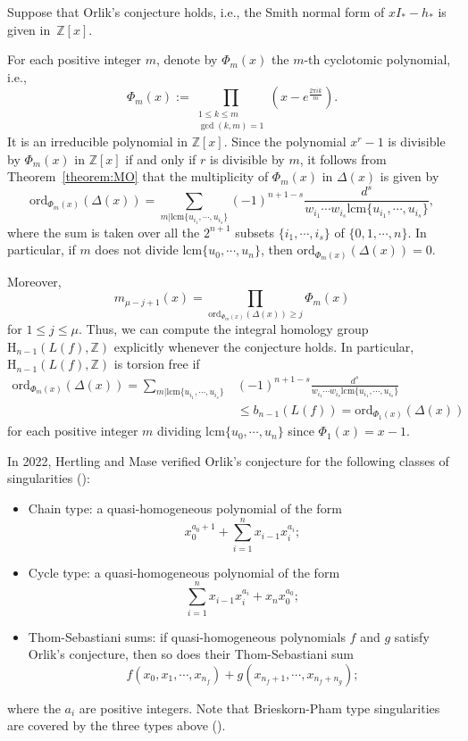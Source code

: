 \documentclass[12pt]{amsart}
\theoremstyle{definition}
\theoremstyle{remark}
\begin{document}
Suppose that Orlik's conjecture holds, i.e., the Smith normal form of  $xI_\ast-h_\ast$ is given in~$\mathbb{Z}[x]$.

For each positive integer $m$, denote by $\Phi_m(x)$ the $m$-th cyclotomic polynomial, i.e.,
\[\Phi_m(x):=\prod_{\substack{1\leq k\leq m \\ \gcd (k,m)=1}}\left(x-e^{\frac{2\pi i k}{m}}\right).\]
It is an irreducible polynomial in $\mathbb{Z}[x]$.
Since the polynomial $x^r-1$ is divisible by $\Phi_m(x)$ in $\mathbb{Z}[x]$ if and only if $r$ is divisible by $m$, it follows from Theorem~\ref{theorem:MO} that
the multiplicity of $\Phi_m(x)$ in $\Delta(x)$ is given by
\[\mathrm{ord}_{\Phi_m(x)}\left(\Delta(x)\right)=\sum_{m|\mathrm{lcm} \{u_{i_1},\cdots, u_{i_s}\}} (-1)^{n+1-s}\frac{d^s}{w_{i_1}\cdots w_{i_s}\mathrm{lcm} \{u_{i_1},\cdots, u_{i_s}\}},\]
 where the sum is taken over all the $2^{n+1}$ subsets $\{i_1,\cdots, i_s\}$ of $\{0,1,\cdots,n\}$. In particular,  if $m$ does not divide 
 $\mathrm{lcm} \{u_0,\cdots, u_n\}$, then $\mathrm{ord}_{\Phi_m(x)}\left(\Delta(x)\right)=0$.
 
 Moreover,
\[m_{\mu-j+1}(x)=\prod_{\mathrm{ord}_{\Phi_m(x)}\left(\Delta(x)\right)\geq j}\Phi_{m}(x)\]
for $1\leq j\leq \mu$. 
Thus, we can compute the integral homology group $\mathrm{H}_{n-1}(L(f),\mathbb{Z})$ explicitly whenever the conjecture holds. 
In particular,
  $\mathrm{H}_{n-1}(L(f),\mathbb{Z})$ is torsion free  if
\begin{equation}\label{eq:torsion2}
\begin{split}
\mathrm{ord}_{\Phi_m(x)}\left(\Delta(x)\right)=\sum_{m|\mathrm{lcm} \{u_{i_1},\cdots, u_{i_s}\}} &(-1)^{n+1-s}\frac{d^s}{w_{i_1}\cdots w_{i_s}\mathrm{lcm} \{u_{i_1},\cdots, u_{i_s}\}}\\
&\leq  b_{n-1}(L(f))=\mathrm{ord}_{\Phi_1(x)}\left(\Delta(x)\right)
\end{split}
\end{equation}
for each positive integer $m$ dividing 
 $\mathrm{lcm} \{u_0,\cdots, u_n\}$ since $\Phi_{1}(x)=x-1$.

In 2022, 
Hertling and Mase verified Orlik's conjecture  for the following classes of singularities (\cite[Theorem~1.3]{HM22}):
\begin{itemize}
    \item Chain type: a quasi-homogeneous polynomial of the form
    \[
        x_0^{a_0+1}+\sum_{i=1}^nx_{i-1}x_i^{a_i};
    \]
    \item Cycle type: a quasi-homogeneous polynomial of the form
    \[
        \sum_{i=1}^nx_{i-1}x_i^{a_i}+x_nx_0^{a_0};
    \]
    \item Thom-Sebastiani sums: if quasi-homogeneous polynomials $f$ and $g$ satisfy Orlik's conjecture, then so does their Thom-Sebastiani sum
    \[ 
        f(x_0,x_1,\cdots,x_{n_f})+g(x_{n_f+1},\cdots,x_{n_f+n_g});
    \]
\end{itemize}
where the $a_i$ are positive integers. Note that Brieskorn-Pham type singularities are covered by the three types above (\cite[Remark~13.1]{HM22}).
\end{document}
